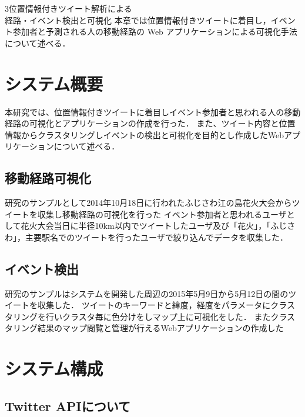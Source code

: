 \chapterhead
{3}{位置情報付きツイート解析による\\
経路・イベント検出と可視化}
{本章では位置情報付きツイートに着目し，イベント参加者と予測される人の移動経路の Web アプリケーションによる可視化手法について述べる．}


\section{システム概要}
本研究では、位置情報付きツイートに着目しイベント参加者と思われる人の移動経路の可視化とアプリケーションの作成を行った．
また、ツイート内容と位置情報からクラスタリングしイベントの検出と可視化を目的とし作成したWebアプリケーションについて述べる．

\subsection{移動経路可視化}
研究のサンプルとして2014年10月18日に行われたふじさわ江の島花火大会\cite{webpage_fujisawa}からツイートを収集し移動経路の可視化を行った
イベント参加者と思われるユーザとして花火大会当日に半径10km以内でツイートしたユーザ及び「花火」，「ふじさわ」，主要駅名でのツイートを行ったユーザで絞り込んでデータを収集した．


\subsection{イベント検出}
研究のサンプルはシステムを開発した周辺の2015年5月9日から5月12日の間のツイートを収集した．
ツイートのキーワードと緯度，経度をパラメータにクラスタリングを行いクラスタ毎に色分けをしマップ上に可視化をした．
またクラスタリング結果のマップ閲覧と管理が行えるWebアプリケーションの作成した



\newpage

\section{システム構成}
\subsection{Twitter APIについて}
